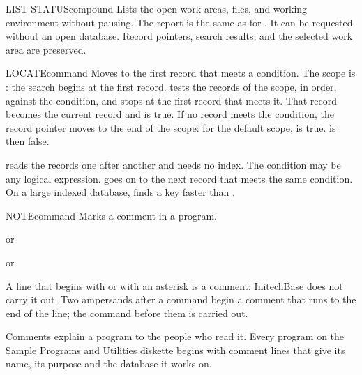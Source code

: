 \begin{XbaseEntry}{LIST STATUS}{compound}
Lists the open work areas, files, and working environment without pausing.
\Syntax
{}
\Usage
The report is the same as for .  It can be requested
without an open database.  Record pointers, search results, and the selected
work area are preserved.
\end{XbaseEntry}

\begin{XbaseEntry}{LOCATE}{command}
Moves to the first record that meets a condition.
\Syntax
{}
\Defaults
The scope is : the search begins at the first record.
\Usage
{} tests the records of the scope, in order, against the 
condition, and stops at the first record that meets it.  That record becomes
the current record and  is true.  If no record meets the
condition, the record pointer moves to the end of the scope: for the default
scope,  is true.   is then false.

 reads the records one after another and needs no index.  The
condition may be any logical expression.   goes on to the next
record that meets the same condition.
\Tips
On a large indexed database,  finds a key faster than .
\Examples
{}
\end{XbaseEntry}

\begin{XbaseEntry}{NOTE}{command}
\XAlso{*}{*}\XAlso{&&}{\&\&}%
Marks a comment in a program.
\Syntax
{}
\par or\par
{}
\par or\par
{}
\Usage
A line that begins with  or with an asterisk is a comment:
InitechBase does not carry it out.  Two ampersands after a command begin a
comment that runs to the end of the line; the command before them is carried
out.

Comments explain a program to the people who read it.  Every program on the
Sample Programs and Utilities diskette begins with comment lines that give its
name, its purpose and the database it works on.
\Examples
{}
\end{XbaseEntry}

